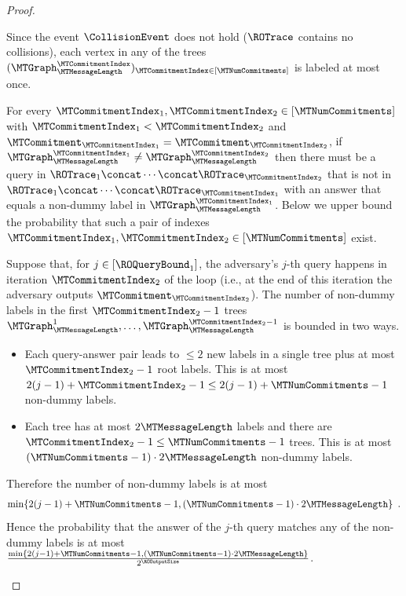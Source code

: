 \begin{proof}
\begin{enumerate}
Since the event $\CollisionEvent$ does not hold ($\ROTrace$ contains no collisions), each vertex in any of the trees $(\MTGraph_{\MTMessageLength}^{\MTCommitmentIndex})_{\MTCommitmentIndex \in [\MTNumCommitments]}$ is labeled at most once.

For every $\MTCommitmentIndex_{1},\MTCommitmentIndex_{2} \in [\MTNumCommitments]$ with $\MTCommitmentIndex_{1} < \MTCommitmentIndex_{2}$ and $\MTCommitment_{\MTCommitmentIndex_{1}} = \MTCommitment_{\MTCommitmentIndex_{2}}$, if $\MTGraph_{\MTMessageLength}^{\MTCommitmentIndex_{1}} \neq \MTGraph_{\MTMessageLength}^{\MTCommitmentIndex_{2}}$ then there must be a query in $\ROTrace_{1} \concat \cdots \concat \ROTrace_{\MTCommitmentIndex_{2}}$ that is not in $\ROTrace_{1} \concat \cdots \concat \ROTrace_{\MTCommitmentIndex_{1}}$ with an answer that equals a non-dummy label in $\MTGraph_{\MTMessageLength}^{\MTCommitmentIndex_{1}}$. Below we upper bound the probability that such a pair of indexes $\MTCommitmentIndex_{1},\MTCommitmentIndex_{2} \in [\MTNumCommitments]$ exist.

Suppose that, for $j \in [\ROQueryBound_{1}]$, the adversary's $j$-th query happens in iteration $\MTCommitmentIndex_{2}$ of the loop (i.e., at the end of this iteration the adversary outputs $\MTCommitment_{\MTCommitmentIndex_{2}}$). The number of non-dummy labels in the first $\MTCommitmentIndex_{2}-1$ trees $\MTGraph_{\MTMessageLength}^{1},\dots,\MTGraph_{\MTMessageLength}^{\MTCommitmentIndex_{2}-1}$ is bounded in two ways.
\begin{itemize}[nolistsep]
\item Each query-answer pair leads to $\leq 2$ new labels in a single tree plus at most $\MTCommitmentIndex_{2}-1$ root labels. This is at most $2(j-1) + \MTCommitmentIndex_{2}-1 \leq 2(j-1) + \MTNumCommitments-1$ non-dummy labels.
\item Each tree has at most $2\MTMessageLength$ labels and there are $\MTCommitmentIndex_{2}-1 \leq \MTNumCommitments-1$ trees. This is at most $(\MTNumCommitments-1) \cdot 2\MTMessageLength$ non-dummy labels.
\end{itemize}
Therefore the number of non-dummy labels is at most
\begin{equation*}
\min\{2(j-1) + \MTNumCommitments-1,(\MTNumCommitments-1) \cdot 2\MTMessageLength\}
\enspace.
\end{equation*}
Hence the probability that the answer of the $j$-th query matches any of the non-dummy labels is at most $\frac{\min\{2(j-1) + \MTNumCommitments-1,(\MTNumCommitments-1) \cdot 2\MTMessageLength\}}{2^{\ROOutputSize}}$.


\end{enumerate}
\end{proof}
